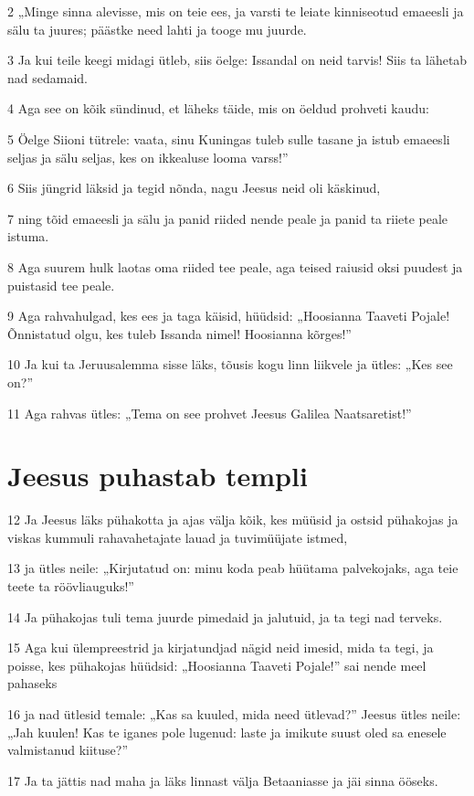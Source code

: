 \par 2 „Minge sinna alevisse, mis on teie ees, ja varsti te leiate kinniseotud emaeesli ja sälu ta juures; päästke need lahti ja tooge mu juurde.
\par 3 Ja kui teile keegi midagi ütleb, siis öelge: Issandal on neid tarvis! Siis ta lähetab nad sedamaid.
\par 4 Aga see on kõik sündinud, et läheks täide, mis on öeldud prohveti kaudu:
\par 5 Öelge Siioni tütrele: vaata, sinu Kuningas tuleb sulle tasane ja istub emaeesli seljas ja sälu seljas, kes on ikkealuse looma varss!”
\par 6 Siis jüngrid läksid ja tegid nõnda, nagu Jeesus neid oli käskinud,
\par 7 ning tõid emaeesli ja sälu ja panid riided nende peale ja panid ta riiete peale istuma.
\par 8 Aga suurem hulk laotas oma riided tee peale, aga teised raiusid oksi puudest ja puistasid tee peale.
\par 9 Aga rahvahulgad, kes ees ja taga käisid, hüüdsid: „Hoosianna Taaveti Pojale! Õnnistatud olgu, kes tuleb Issanda nimel! Hoosianna kõrges!”
\par 10 Ja kui ta Jeruusalemma sisse läks, tõusis kogu linn liikvele ja ütles: „Kes see on?”
\par 11 Aga rahvas ütles: „Tema on see prohvet Jeesus Galilea Naatsaretist!”

\section*{Jeesus puhastab templi}

\par 12 Ja Jeesus läks pühakotta ja ajas välja kõik, kes müüsid ja ostsid pühakojas ja viskas kummuli rahavahetajate lauad ja tuvimüüjate istmed,
\par 13 ja ütles neile: „Kirjutatud on: minu koda peab hüütama palvekojaks, aga teie teete ta röövliauguks!”
\par 14 Ja pühakojas tuli tema juurde pimedaid ja jalutuid, ja ta tegi nad terveks.
\par 15 Aga kui ülempreestrid ja kirjatundjad nägid neid imesid, mida ta tegi, ja poisse, kes pühakojas hüüdsid: „Hoosianna Taaveti Pojale!” sai nende meel pahaseks
\par 16 ja nad ütlesid temale: „Kas sa kuuled, mida need ütlevad?” Jeesus ütles neile: „Jah kuulen! Kas te iganes pole lugenud: laste ja imikute suust oled sa enesele valmistanud kiituse?”
\par 17 Ja ta jättis nad maha ja läks linnast välja Betaaniasse ja jäi sinna ööseks.

